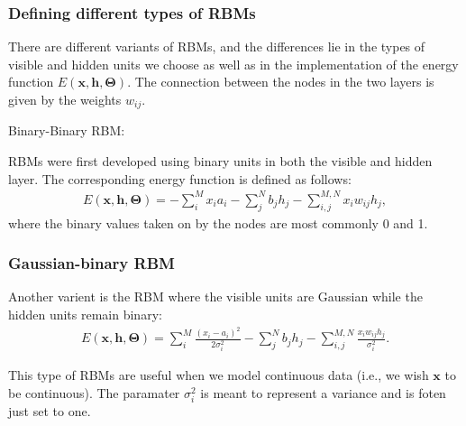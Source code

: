 \documentclass{beamer}
\begin{document}
\begin{frame}
\frametitle{Defining different types of RBMs}

There are different variants of RBMs, and the differences lie in the types of visible and hidden units we choose as well as in the implementation of the energy function $E(\bm{x},\bm{h},\bm{\Theta})$. The connection between the nodes in the two layers is given by the weights $w_{ij}$. 

\begin{block}{Binary-Binary RBM: }

RBMs were first developed using binary units in both the visible and hidden layer. The corresponding energy function is defined as follows:
\begin{align*}
	E(\bm{x}, \bm{h},\bm{\Theta}) = - \sum_i^M x_i a_i- \sum_j^N b_j h_j - \sum_{i,j}^{M,N} x_i w_{ij} h_j,
\end{align*}
where the binary values taken on by the nodes are most commonly 0 and 1.
\end{block}
\end{frame}

\begin{frame}
\frametitle{Gaussian-binary RBM}

Another varient is the RBM where the visible units are Gaussian while the hidden units remain binary:
\begin{align*}
	E(\bm{x}, \bm{h},\bm{\Theta}) = \sum_i^M \frac{(x_i - a_i)^2}{2\sigma_i^2} - \sum_j^N b_j h_j - \sum_{i,j}^{M,N} \frac{x_i w_{ij} h_j}{\sigma_i^2}. 
\end{align*}

This type of RBMs are useful when we model continuous data (i.e., we wish $\bm{x}$ to be continuous). The paramater $\sigma_i^2$ is meant to represent a variance and is foten just set to one.
\end{frame}
\end{document}
